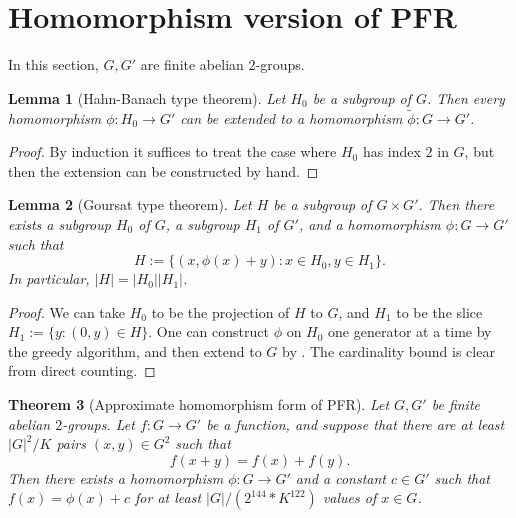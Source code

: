\documentclass[10pt,a4paper]{article}
\newtheorem{theorem}{Theorem}
\newtheorem{lemma}[theorem]{Lemma}
\newcommand{\lean}[1]{}
\newcommand{\uses}[1]{}
\newcommand{\leanok}{}
\newcommand{\chapter}[1]{\section{#1}}
\begin{document}
\chapter{Homomorphism version of PFR}

In this section, $G, G'$ are finite abelian $2$-groups.

\begin{lemma}[Hahn-Banach type theorem]\label{hb-thm}\lean{hahn_banach}\leanok  Let $H_0$ be a subgroup of $G$.  Then every homomorphism $\phi: H_0 \to G'$ can be extended to a homomorphism $\tilde \phi: G \to G'$.
\end{lemma}

\begin{proof}\leanok  By induction it suffices to treat the case where $H_0$ has index $2$ in $G$, but then the extension can be constructed by hand.
\end{proof}

\begin{lemma}[Goursat type theorem]\label{goursat}\lean{goursat}\leanok  Let $H$ be a subgroup of $G \times G'$.  Then there exists a subgroup $H_0$ of $G$, a subgroup $H_1$ of $G'$, and a homomorphism $\phi: G \to G'$ such that
$$ H := \{ (x, \phi(x) + y): x \in H_0, y \in H_1 \}.$$
In particular, $|H| = |H_0| |H_1|$.
\end{lemma}

\begin{proof}\uses{hb-thm}\leanok We can take $H_0$ to be the projection of $H$ to $G$, and $H_1$ to be the slice $H_1 := \{ y: (0,y) \in H \}$.  One can construct $\phi$ on $H_0$ one generator at a time by the greedy algorithm, and then extend to $G$ by .  The cardinality bound is clear from direct counting.
\end{proof}

\begin{theorem}[Approximate homomorphism form of PFR]\label{approx-hom-pfr}\lean{approx_hom_pfr}\leanok Let $G,G'$ be finite abelian $2$-groups.
  Let $f: G \to G'$ be a function, and suppose that there are at least $|G|^2 / K$ pairs $(x,y) \in G^2$ such that
$$ f(x+y) = f(x) + f(y).$$
Then there exists a homomorphism $\phi: G \to G'$ and a constant $c \in G'$
such that $f(x) = \phi(x)+c$ for at least $|G| / (2 ^ {144} * K ^ {122})$
values of $x \in G$.
\end{theorem}
\end{document}
